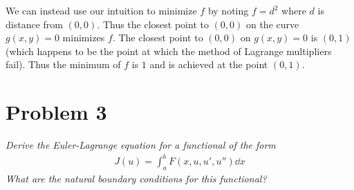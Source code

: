 \documentclass[12pt]{article}
\theoremstyle{plain}
\begin{document}
We can instead use our intuition to minimize $f$ by noting $f = d^2$ where $d$ is distance from $(0, 0)$.  Thus the closest point to $(0, 0)$ on the curve $g(x,y) = 0$ minimizes $f$.  The closest point to $(0, 0)$ on $g(x, y) = 0$ is $(0, 1)$ (which happens to be the point at which the method of Lagrange multipliers fail).  Thus the minimum of $f$ is $1$ and is achieved at the point $(0, 1)$.

\section*{Problem 3}
\textit{Derive the Euler-Lagrange equation for a functional of the form}
\begin{align*}
    J(u) = \int_a^b F(x, u, u', u'') \dd x
\end{align*}
\textit{What are the natural boundary conditions for this functional?} \\
\end{document}

